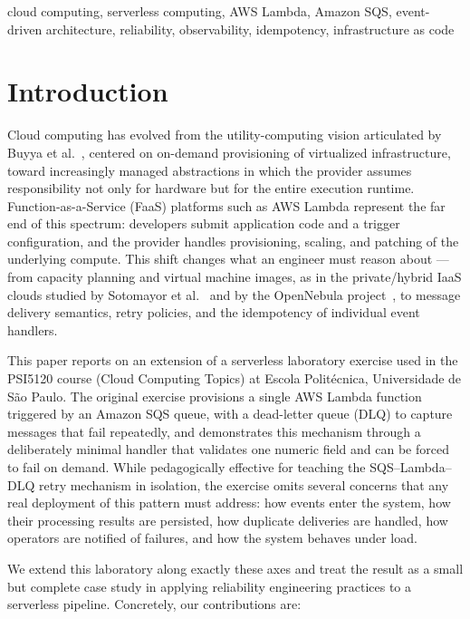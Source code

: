 \documentclass[conference]{IEEEtran}
\begin{document}
\begin{IEEEkeywords}
cloud computing, serverless computing, AWS Lambda, Amazon SQS, event-driven architecture, reliability, observability, idempotency, infrastructure as code
\end{IEEEkeywords}

\section{Introduction}

Cloud computing has evolved from the utility-computing vision articulated by Buyya et al.~\cite{buyya2009}, centered on on-demand provisioning of virtualized infrastructure, toward increasingly managed abstractions in which the provider assumes responsibility not only for hardware but for the entire execution runtime. Function-as-a-Service (FaaS) platforms such as AWS Lambda represent the far end of this spectrum: developers submit application code and a trigger configuration, and the provider handles provisioning, scaling, and patching of the underlying compute. This shift changes what an engineer must reason about --- from capacity planning and virtual machine images, as in the private/hybrid IaaS clouds studied by Sotomayor et al.~\cite{sotomayor2009} and by the OpenNebula project~\cite{opennebula2011}, to message delivery semantics, retry policies, and the idempotency of individual event handlers.

This paper reports on an extension of a serverless laboratory exercise used in the PSI5120 course (Cloud Computing Topics) at Escola Politécnica, Universidade de São Paulo. The original exercise provisions a single AWS Lambda function triggered by an Amazon SQS queue, with a dead-letter queue (DLQ) to capture messages that fail repeatedly, and demonstrates this mechanism through a deliberately minimal handler that validates one numeric field and can be forced to fail on demand. While pedagogically effective for teaching the SQS--Lambda--DLQ retry mechanism in isolation, the exercise omits several concerns that any real deployment of this pattern must address: how events enter the system, how their processing results are persisted, how duplicate deliveries are handled, how operators are notified of failures, and how the system behaves under load.

We extend this laboratory along exactly these axes and treat the result as a small but complete case study in applying reliability engineering practices to a serverless pipeline. Concretely, our contributions are:
\end{document}
